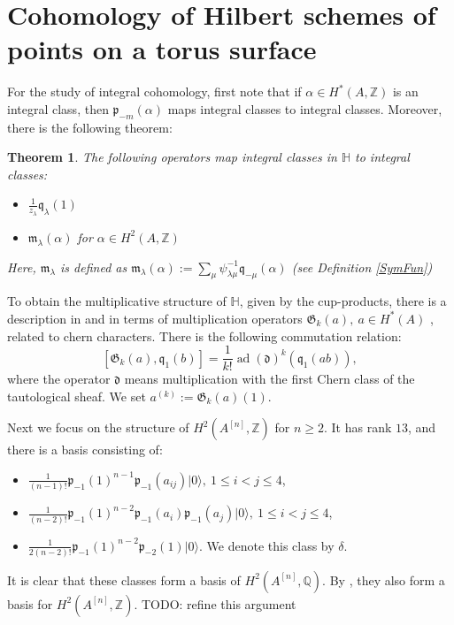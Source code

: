 \documentclass{amsart}
\DeclareMathOperator{\ad}{ad}
\newcommand{\hilb}[1]{^{[#1]}}
\newcommand{\vac}{|0\rangle}
\newcommand{\p}{\mathfrak{p}}
\renewcommand{\H}{\mathbb{H}}
\newcommand{\Q}{\mathbb{Q}}
\newcommand{\Z}{\mathbb{Z}}
\newcommand{\kq}{\mathfrak{q}}
\theoremstyle{plain}
\newtheorem{theorem}{Theorem}[section]
\theoremstyle{definition}
\theoremstyle{remark}
\begin{document}
\section{Cohomology of Hilbert schemes of points on a torus surface}

For the study of integral cohomology, first note that if $\alpha \in H^*(A,\Z)$ is an integral class, then $\p_{-m}(\alpha) $ maps integral classes to integral classes. 
Moreover, there is the following theorem:
\begin{theorem} \cite{QinWang}
The following operators map integral classes in $\H$ to integral classes:
\begin{itemize}
\item $\frac{1}{z_\lambda}\kq_{\lambda}(1)$ 
\item $\mathfrak{m}_{\lambda}(\alpha)$ for $\alpha \in H^2(A,\Z)$ 
\end{itemize}
Here, $\mathfrak{m}_{\lambda}$ is defined as $\mathfrak{m}_{\lambda}(\alpha):=\sum_{\mu} \psi^{-1}_{\lambda\mu} \kq_{-\mu}(\alpha) $ (see Definition \ref{SymFun})
\end{theorem}

To obtain the multiplicative structure of $\H$, given by the cup-products, there is a description in \cite{LehnSorger} and \cite{LiQinWang} in terms of multiplication operators $\mathfrak{G}_k(a),\ a\in H^*(A)$ \cite[Def.~5.1]{LiQinWang}, related to chern characters. There is the following commutation relation: 
$$
[\mathfrak{G}_k(a),\kq_1(b)] = \frac{1}{k!}\ad(\mathfrak{d})^k(\kq_1(ab)),
$$
where the operator $\mathfrak{d}$ means multiplication with the first Chern class of the tautological sheaf.
We set $a^{(k)} := \mathfrak{G}_k(a) (1)$.

Next we focus on the structure of $H^2(A\hilb{n},\Z)$ for $n\geq 2$. It has rank $13$, and there is a basis consisting of:
\begin{itemize}
 \item $\frac{1}{(n-1)!}\p_{-1}(1)^{n-1}\p_{-1}(a_{ij})\vac,\ 1\leq i < j\leq 4$,
 \item $\frac{1}{(n-2)!}\p_{-1}(1)^{n-2}\p_{-1}(a_{i})\p_{-1}(a_{j})\vac,\ 1\leq i < j\leq 4$,
 \item $\frac{1}{2(n-2)!}\p_{-1}(1)^{n-2}\p_{-2}(1) \vac$. We denote this class by $\delta$.
\end{itemize}
It is clear that these classes form a basis of $H^2(A\hilb{n},\Q)$. By \cite[Thm.~4.6,Lemma~5.2]{QinWang}, they also form a basis for $H^2(A\hilb{n},\Z)$. TODO: refine this argument
\end{document}
